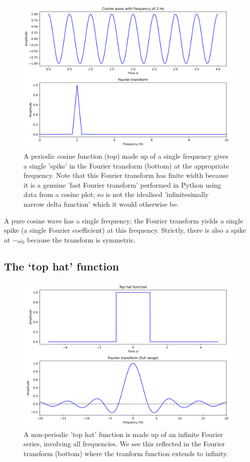 \documentclass[
]{book}
\begin{document}
\begin{figure}

{\centering \includegraphics[width=0.7\linewidth]{visualisations/ch11-ftcosinefunction1} 

}

\caption{A periodic cosine function (top) made up of a single frequency gives a single 'spike' in the Fourier transform (bottom) at the appropriate frequency. Note that this Fourier transform has finite width because it is a genuine 'fast Fourier transform' performed in Python using data from a cosine plot; so is not the idealised 'infinitesimally narrow delta function' which it would otherwise be.}\label{fig:ch11-ftcosinefunction1}
\end{figure}

A pure cosine wave has a single frequency; the Fourier transform yields a single spike (a single Fourier coefficient) at this frequency. Strictly, there is also a spike at \(-\omega_0\) because the transform is symmetric.

\hypertarget{sec-ch11-fttophat}{%
\subsection{The `top hat' function}\label{sec-ch11-fttophat}}

\begin{figure}

{\centering \includegraphics[width=0.7\linewidth]{visualisations/ch11-fttophat1} 

}

\caption{A non-periodic 'top hat' function is made up of an infinite Fourier series, involving all frequencies. We see this reflected in the Fourier transform (bottom) where the tranform function extends to infinity.}\label{fig:ch11-fttophat1}
\end{figure}
\end{document}
